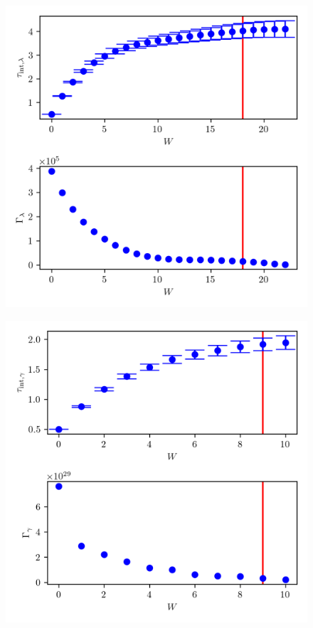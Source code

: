 \begin{figure}[ht!]
	\centering
	\includegraphics{UwerrTauIntFirstO3lam.png}
	\caption[]{}
	\label{fig:}
\end{figure}
\begin{figure}[ht!]
	\centering
	\includegraphics{UwerrTauIntFirstO3gam.png}
	\caption[]{}
	\label{fig:}
\end{figure}

